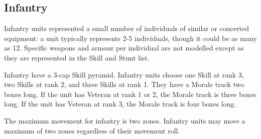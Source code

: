 \subsection{Infantry}
\label{sec:Infantry}

% 

Infantry units represented a small number of individuals of similar or concerted equipment: a unit typically represents 2-5 individuals, though it could be as many as 12. Specific weapons and armour per individual are not modelled except as they are represented in the Skill and Stunt list.

Infantry have a 3-cap Skill pyramid. Infantry units choose one Skill at rank 3, two Skills at rank 2, and three Skills at rank 1. They have a Morale track two boxes long. If the unit has Veteran at rank 1 or 2, the Morale track is three boxes long. If the unit has Veteran at rank 3, the Morale track is four boxes long.

The maximum movement for infantry is two zones. Infantry units may move a maximum of two zones regardless of their movement roll.

